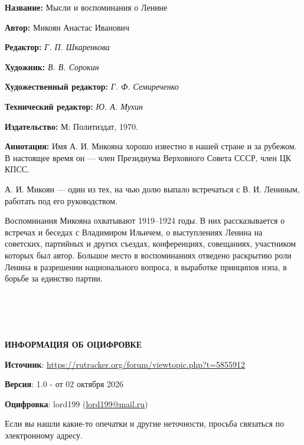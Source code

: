 \documentclass[12pt, a4paper, openany]{book}
\begin{document}
	{\bf Название:} Мысли и воспоминания о Ленине
	
{\bf Автор:} Микоян Анастас Иванович

{\bf Редактор:} \textit{Г. П. Шкаренкова}

{\bf Художник:} \textit{В. В. Сорокин}

{\bf Художественный редактор:} \textit{Г. Ф. Семиреченко}

{\bf Технический редактор:} \textit{Ю. А. Мухин}
	
{\bf Издательство:} М: Политиздат, 1970.
	
		{\bf Аннотация:} Имя А. И. Микояна хорошо известно в нашей стране и за рубежом. В настоящее время он — член Президиума Верховного Совета СССР, член ЦК КПСС.
		
		А. И. Микоян — один из тех, на чью долю выпало встречаться с В. И. Лениным, работать под его руководством.
		
		Воспоминания Микояна охватывают 1919–1924 годы. В них рассказывается о встречах и беседах с Владимиром Ильичем, о выступлениях Ленина на советских, партийных и других съездах, конференциях, совещаниях, участником которых был автор. Большое место в воспоминаниях отведено раскрытию роли Ленина в разрешении национального вопроса, в выработке принципов нэпа, в борьбе за единство партии.
		
		


		\thispagestyle{empty} %


\newpage

\setcounter{secnumdepth}{0}  


\ \\
\ \\
\ \\
\ \\

\hangindent=2cm   	\textbf{ИНФОРМАЦИЯ ОБ ОЦИФРОВКЕ}

\hangindent=2cm   	\textbf{Источник}:  \href{https://rutracker.org/forum/viewtopic.php?t=5855912}{https://rutracker.org/forum/viewtopic.php?t=5855912} 

\hangindent=2cm   	\textbf{Версия}: 1.0 - от 02 октября 2026

\hangindent=2cm   	\textbf{Оцифровка}: lord199 (\href{mailto:lord199@mail.ru}{lord199@mail.ru})



\hangindent=2cm   Если вы нашли какие-то опечатки и другие неточности, просьба связаться по электронному адресу.




\thispagestyle{empty} %
	
\end{document}
